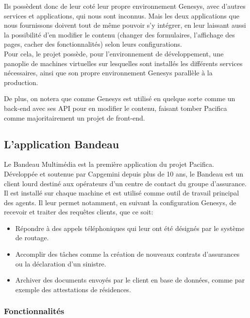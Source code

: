 \documentclass{rapport}
\begin{document}
Ils possèdent donc de leur coté leur propre environnement Genesys, avec d'autres services et applications, qui nous sont inconnus. Mais les deux applications que nous fournissons doivent tout de même pouvoir s'y intégrer, en leur laissant aussi la possibilité d'en modifier le contenu (changer des formulaires, l'affichage des pages, cacher des fonctionnalités) selon leurs configurations.\\
Pour cela, le projet possède, pour l'environnement de développement, une panoplie de machines virtuelles sur lesquelles sont installés les différents services nécessaires, ainsi que son propre environnement Genesys parallèle à la production.

De plus, on notera que comme Genesys est utilisé en quelque sorte comme un back-end avec ses API pour en modifier le contenu, faisant tomber Pacifica comme majoritairement un projet de front-end.\\

\subsection{L'application Bandeau}

Le Bandeau Multimédia est la première application du projet Pacifica. Développée et soutenue par Capgemini depuis plus de 10 ans, le Bandeau est un client lourd destiné aux opérateurs d'un centre de contact du groupe d'assurance. Il est installé sur chaque machine et est utilisé comme outil de travail principal des agents. Il leur permet notamment, en suivant la configuration Genesys, de recevoir et traiter des requêtes clients, que ce soit:\\

\begin{itemize}
\item Répondre à des appels téléphoniques qui leur ont été désignés par le système de routage.
\item Accomplir des tâches comme la création de nouveaux contrats d'assurances ou la déclaration d'un sinistre.
\item Archiver des documents envoyés par le client en base de données, comme par exemple des attestations de résidences.
\end{itemize}

\subsubsection{Fonctionnalités}
\end{document}

